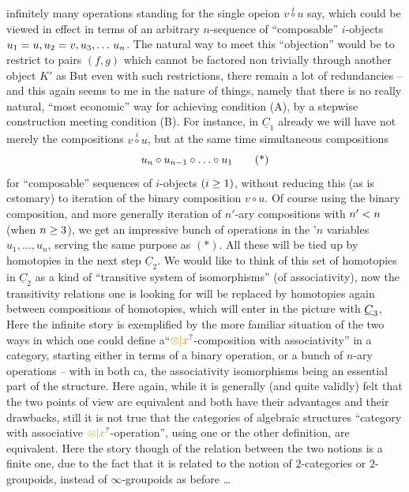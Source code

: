 infinitely many operations standing for the single opeion $v\overset{i}{\circ}u$ say, which could be viewed in effect in terms of an arbitrary $n$-sequence  of ``composable'' $i$-objects $u_1=u,u_{2}=v,u_{3},\ldots\,u_n$. The natural way to meet this ``objection'' would be to restrict to  pairs $(f,g)$ which cannot be factored non trivially through another object $K'$ as
But even with such restrictions, there remain a lot of redundancies -- and this again seems to me in the nature of things, namely that there is no really natural, ``most economic'' way for achieving condition (A), by a stepwise construction meeting condition (B). For instance, in $\underline{C}_1$ already we will have  not merely the compositions $v\overset{i}{\circ}u$, but at the same time simultaneous compositions
\[
u_n\circ u_{n-1}\circ\ldots\circ u_1 \tag*{(*)}
\]
for ``composable'' sequences of $i$-objects $(i\geq1)$, without reducing this (as is cstomary) to iteration of the binary composition $v\circ u$. Of course using the binary composition, and more generally iteration of $n'$-ary compositions with $n'<n$ (when $n\geq3$), we get an impressive bunch of operations in the '$n$ variables $u_1,\ldots,u_n$, serving the same purpose as $(*)$. All these will be tied up by homotopies in the next step $\underline{C}_2$. We would like to think of this set of homotopies in $\underline{C}_2$ as a kind of ``transitive system of isomorphisms'' (of associativity), now the transitivity relations one is looking for will be replaced by homotopies again between compositions of homotopies, which will enter in the picture with $\underline{C}_{3}$,  Here the infinite story is exemplified by the more familiar situation of the two ways in which one could define a``$\unsure{\otimes|x}$-composition with associativity'' in a category,  starting either in terms of a binary operation, or  a bunch of $n$-ary operations -- with\handwritten{,} in both ca, the associativity isomorphisms being an essential part of the structure. Here again, while it is generally (and quite validly) felt that the two points of view are equivalent\unsure{;|,} and both have their advantages and their drawbacks, still it is not true  that the  categories of algebraic structures ``category with associative $\unsure{\otimes|x}$-operation'', using one or the other definition, are equivalent. Here the story though of the relation between the two notions is a finite one, due to the fact that it is related to the notion of $2$-categories or $2$-groupoids, instead of $\infty$-groupoids as before \ldots

